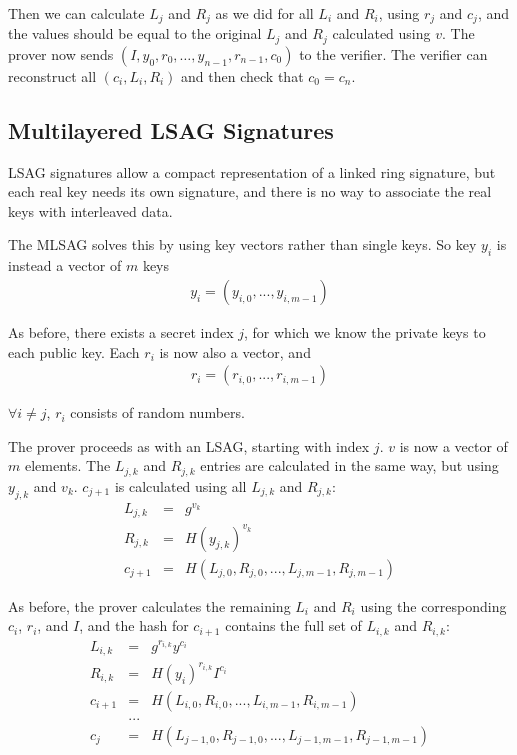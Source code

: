 \documentclass{article}
\begin{document}
Then we can calculate $L_j$ and $R_j$ as we did for all $L_i$ and $R_i$, using $r_j$ and $c_j$, and the values should be equal to the original $L_j$ and $R_j$ calculated using $v$. The prover now sends $(I, y_0, r_0, …, y_{n-1}, r_{n-1}, c_0)$ to the verifier.  The verifier can reconstruct all $(c_i, L_i, R_i)$ and then check that $c_0 = c_n$.


\subsection{Multilayered LSAG Signatures}

LSAG signatures allow a compact representation of a linked ring signature, but each real key needs its own signature, and there is no way to associate the real keys with interleaved data.

The MLSAG solves this by using key vectors rather than single keys.  So key $y_i$ is instead a vector of $m$ keys
\begin{eqnarray}
  y_i = (y_{i,0}, ..., y_{i,m-1})
\end{eqnarray}

As before, there exists a secret index $j$, for which we know the private keys to each public key.  Each $r_i$ is now also a vector, and
\begin{eqnarray}
  r_i = (r_{i,0}, ..., r_{i,m-1})
\end{eqnarray}

$\forall i \ne j$, $r_i$ consists of random numbers.

The prover proceeds as with an LSAG, starting with index $j$.  $v$ is now a vector of $m$ elements.  The $L_{j,k}$ and $R_{j,k}$ entries are calculated in the same way, but using $y_{j,k}$ and $v_k$.  $c_{j+1}$ is calculated using all $L_{j,k}$ and $R_{j,k}$:
\begin{eqnarray}
  L_{j,k} &=& g^{v_k}\\
  R_{j,k} &=& H(y_{j,k})^{v_k}\\
  c_{j+1} &=& H(L_{j,0}, R_{j,0}, ..., L_{j,m-1}, R_{j,m-1})
\end{eqnarray}

As before, the prover calculates the remaining $L_i$ and $R_i$ using the corresponding $c_i$, $r_i$, and $I$, and the hash for $c_{i+1}$ contains the full set of $L_{i,k}$ and $R_{i,k}$:
\begin{eqnarray}
  L_{i,k} &=& g^{r_{i,k}} y^{c_i}\\
  R_{i,k} &=& H(y_i)^{r_{i,k}} I^{c_i}\\
  c_{i+1} &=& H(L_{i,0}, R_{i,0}, ..., L_{i,m-1}, R_{i,m-1}) \\
  &...& \\
  c_j &=& H(L_{j-1,0}, R_{j-1,0}, ..., L_{j-1,m-1}, R_{j-1,m-1}) 
\end{eqnarray}
\end{document}
